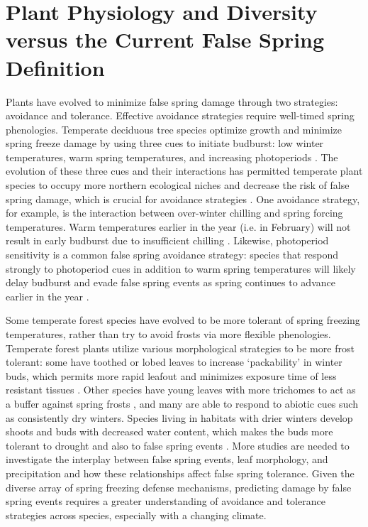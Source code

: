 \documentclass{article}\usepackage[]{graphicx}\usepackage[]{color}
\begin{document}
\section {Plant Physiology and Diversity versus the Current False Spring Definition}
Plants have evolved to minimize false spring damage through two strategies: avoidance and tolerance. Effective avoidance strategies require well-timed spring phenologies. Temperate deciduous tree species optimize growth and minimize spring freeze damage by using three cues to initiate budburst: low winter temperatures, warm spring temperatures, and increasing photoperiods \citep{Cleland2007, Chuine2010}. The evolution of these three cues and their interactions has permitted temperate plant species to occupy more northern ecological niches and decrease the risk of false spring damage, which is crucial for avoidance strategies \citep{Samish1954}. One avoidance strategy, for example, is the interaction between over-winter chilling and spring forcing temperatures. Warm temperatures earlier in the year (i.e. in February) will not result in early budburst due to insufficient chilling \citep{Basler2012}. Likewise, photoperiod sensitivity is a common false spring avoidance strategy: species that respond strongly to photoperiod cues in addition to warm spring temperatures will likely delay budburst and evade false spring events as spring continues to advance earlier in the year \citep{Basler2014}. 

Some temperate forest species have evolved to be more tolerant of spring freezing temperatures, rather than try to avoid frosts via more flexible phenologies. Temperate forest plants utilize various morphological strategies to be more frost tolerant: some have toothed or lobed leaves to increase `packability' in winter buds, which permits more rapid leafout and minimizes exposure time of less resistant tissues \citep{Edwards2017}. Other species have young leaves with more trichomes to act as a buffer against spring frosts \citep{Agrawal2004}, and many are able to respond to abiotic cues such as consistently dry winters. Species living in habitats with drier winters develop shoots and buds with decreased water content, which makes the buds more tolerant to drought and also to false spring events \citep{Beck2007, Morin2007, Nielsen2009, Poirier2010, Kathke2011, Hofmann2015}. More studies are needed to investigate the interplay between false spring events, leaf morphology, and precipitation and how these relationships affect false spring tolerance. Given the diverse array of spring freezing defense mechanisms, predicting damage by false spring events requires a greater understanding of avoidance and tolerance strategies across species, especially with a changing climate.
\end{document}
